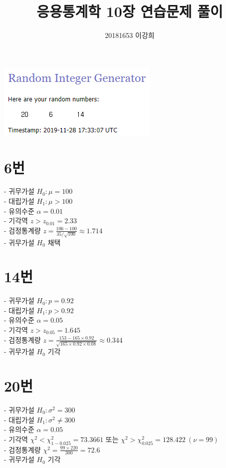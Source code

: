 \documentclass[12px]{article}
\title{응용통계학 10장 연습문제 풀이}
\author{20181653 이강희}
\date{}
\begin{document}
\maketitle

\begin{center}
\includegraphics[scale=0.7]{random}
\end{center}

\section*{6번}
- 귀무가설 $H_0 : \mu = 100$ \\
- 대립가설 $H_1 : \mu > 100$ \\
- 유의수준 $\alpha = 0.01$ \\
- 기각역 $z > z_{0.01} = 2.33$ \\
- 검정통계량 $z = \frac{106-100}{35/\sqrt{100}} \approx 1.714$ \\
- 귀무가설 $H_0$ 채택

\section*{14번}
- 귀무가설 $H_0 : p = 0.92$ \\
- 대립가설 $H_1 : p > 0.92$ \\
- 유의수준 $\alpha = 0.05$ \\
- 기각역 $z > z_{0.05} = 1.645$ \\
- 검정통계량 $z = \frac{153-165 \times 0.92}{\sqrt{165 \times 0.92 \times 0.08}} \approx 0.344$ \\
- 귀무가설 $H_0$ 기각

\section*{20번}
- 귀무가설 $H_0 : \sigma^2 = 300$ \\
- 대립가설 $H_1 : \sigma^2 \neq 300$ \\
- 유의수준 $\alpha = 0.05$ \\
- 기각역 $\chi^2 < \chi_{1-0.025}^{2} = 73.3661$ 또는 $\chi^2 > \chi_{0.025}^{2} = 128.422 \ (\nu=99)$ \\
- 검정통계량 $\chi^2 = \frac{99 \times 220}{300} = 72.6$ \\
- 귀무가설 $H_0$ 기각
\end{document}
